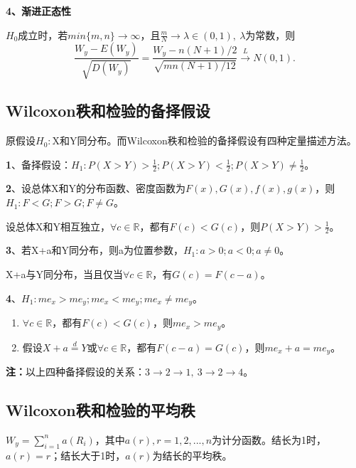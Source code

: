 \documentclass[lang=cn,10pt]{elegantbook}
\begin{document}
\textbf{4、渐进正态性}
\begin{proposition}
    $H_0$成立时，若$min\{m,n\}\rightarrow \infty$，且$\frac{m}N \rightarrow \lambda \in (0,1),~\lambda$为常数，则
    \begin{equation}
        \frac{W_y-E(W_y)}{\sqrt{D(W_y)}}=\frac{W_y-n\left(N+1\right)/2}{\sqrt{mn\left(N+1\right)/12}}\xrightarrow{L}N(0,1).
    \end{equation}
\end{proposition}

\subsection{Wilcoxon秩和检验的备择假设}
原假设$H_0:$X和Y同分布。而Wilcoxon秩和检验的备择假设有四种定量描述方法。

\textbf{1}、备择假设：$H_1:P(X>Y)>\frac12;P(X>Y)<\frac12;P(X>Y)\neq \frac12$。

\textbf{2}、设总体X和Y的分布函数、密度函数为$F(x),G(x),f(x),g(x)$，则$H_1:F < G; F > G; F\neq G$。
\begin{theorem}
    设总体X和Y相互独立，$\forall c\in \mathbb{R} $，都有$F(c)<G(c)$，则$P(X>Y)>\frac12$。
\end{theorem}

\textbf{3}、若X+a和Y同分布，则a为位置参数，$H_1:a>0;a<0;a\neq 0$。
\begin{theorem}
    X+a与Y同分布，当且仅当$\forall c\in \mathbb{R}$，有$G(c)= F(c-a)$。
\end{theorem}

\textbf{4}、$H_1:me_x > me_y; me_x < me_y; me_x \neq me_y$。
\begin{theorem}
    \begin{enumerate}[(1)]
        \item $\forall c \in \mathbb{R}$，都有$F(c) < G(c)$，则$me_x > me_y$。
        \item 假设$X+a\overset{d}{=}Y$或$\forall c \in \mathbb{R}$，都有$F(c-a) = G(c)$，则$me_x+a = me_y$。
    \end{enumerate}
\end{theorem}

\textbf{注：}以上四种备择假设的关系：$3 \rightarrow 2 \rightarrow 1,~ 3 \rightarrow 2 \rightarrow 4$。

\subsection{Wilcoxon秩和检验的平均秩}
$W_y = \sum_{i = 1}^{n}a(R_i)$，其中$a(r),r = 1,2,...,n$为计分函数。结长为1时，$a(r) = r$；结长大于1时，$a(r)$为结长的平均秩。
\end{document}
